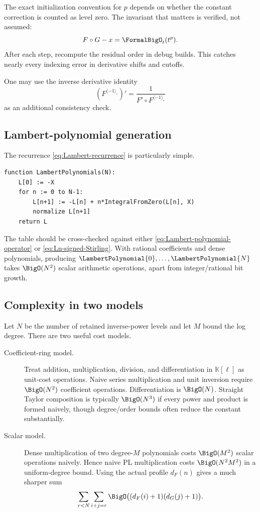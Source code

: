 \documentclass[11pt,oneside]{article}
\numberwithin{equation}{section}
\theoremstyle{definition}
\newcommand{\K}{\mathbb{K}}
\newcommand{\rev}{\langle-1\rangle_{\circ}}
\begin{document}
The exact initialization convention for \(p\) depends on whether the constant
correction is counted as level zero.  The invariant that matters is verified,
not assumed:
\[
  F\circ G-x=\FormalBigO_t(t^p).
\]
After each step, recompute the residual order in debug builds.  This catches
nearly every indexing error in derivative shifts and cutoffs.

One may use the inverse derivative identity
\begin{equation}\label{eq:inverse-derivative-identity}
  (F^{\rev})'=\frac{1}{F'\circ F^{\rev}}
\end{equation}
as an additional consistency check.

\subsection{Lambert-polynomial generation}

The recurrence \eqref{eq:Lambert-recurrence} is particularly simple.

\begin{lstlisting}[style=pseudocode,caption={Exact Lambert polynomials.}]
function LambertPolynomials(N):
    L[0] := -X
    for n := 0 to N-1:
        L[n+1] := -L[n] + n*IntegralFromZero(L[n], X)
        normalize L[n+1]
    return L
\end{lstlisting}

The table should be cross-checked against either
\eqref{eq:Lambert-polynomial-operator} or
\eqref{eq:Ln-signed-Stirling}.  With rational coefficients and dense
polynomials, producing \(\LambertPolynomial{0},\ldots,\LambertPolynomial{N}\) takes \(\BigO(N^2)\) scalar arithmetic
operations, apart from integer/rational bit growth.

\subsection{Complexity in two models}

Let \(N\) be the number of retained inverse-power levels and let \(M\) bound the
log degree.  There are two useful cost models.

\begin{description}
\item[Coefficient-ring model.]  Treat addition, multiplication, division, and
  differentiation in \(\K[\ell]\) as unit-cost operations.  Naive series
  multiplication and unit inversion require \(\BigO(N^2)\) coefficient operations.
  Differentiation is \(\BigO(N)\).  Straight Taylor composition is typically
  \(\BigO(N^3)\) if every power and product is formed naively, though degree/order
  bounds often reduce the constant substantially.
\item[Scalar model.]  Dense multiplication of two degree-\(M\) polynomials costs
  \(\BigO(M^2)\) scalar operations naively.  Hence naive PL multiplication costs
  \(\BigO(N^2M^2)\) in a uniform-degree bound.  Using the actual profile
  \(d_F(n)\) gives a much sharper sum
  \[
    \sum_{r<N}\sum_{i+j=r}
      \BigO\bigl((d_F(i)+1)(d_G(j)+1)\bigr).
  \]
\end{description}
\end{document}
